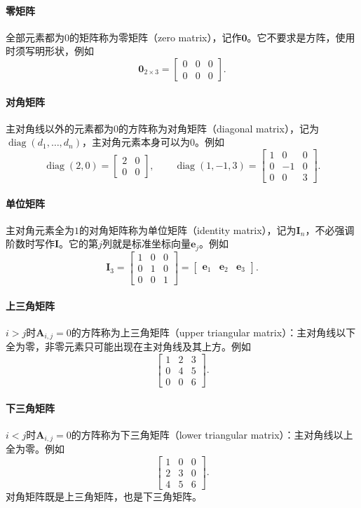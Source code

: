 \paragraph{零矩阵}
全部元素都为$0$的矩阵称为零矩阵（zero matrix），记作$\bm0$。它不要求是方阵，使用时须写明形状，例如
\[
 \bm0_{2\times3}=\begin{bmatrix}0&0&0\\0&0&0\end{bmatrix}.
\]

\paragraph{对角矩阵}
主对角线以外的元素都为$0$的方阵称为对角矩阵（diagonal matrix），记为$\operatorname{diag}(d_1,\ldots,d_n)$，主对角元素本身可以为$0$。例如
\[
 \operatorname{diag}(2,0)=\begin{bmatrix}2&0\\0&0\end{bmatrix},\qquad
 \operatorname{diag}(1,-1,3)=\begin{bmatrix}1&0&0\\0&-1&0\\0&0&3\end{bmatrix}.
\]

\paragraph{单位矩阵}
主对角元素全为$1$的对角矩阵称为单位矩阵（identity matrix），记为$\bm I_n$，不必强调阶数时写作$\bm I$。它的第$j$列就是标准坐标向量$\bm e_j$。例如
\[
 \bm I_3=\begin{bmatrix}1&0&0\\0&1&0\\0&0&1\end{bmatrix}=\begin{bmatrix}\bm e_1&\bm e_2&\bm e_3\end{bmatrix}.
\]

\paragraph{上三角矩阵}
$i>j$时$\bm A_{i,j}=0$的方阵称为上三角矩阵（upper triangular matrix）：主对角线以下全为零，非零元素只可能出现在主对角线及其上方。例如
\[
 \begin{bmatrix}1&2&3\\0&4&5\\0&0&6\end{bmatrix}.
\]

\paragraph{下三角矩阵}
$i<j$时$\bm A_{i,j}=0$的方阵称为下三角矩阵（lower triangular matrix）：主对角线以上全为零。例如
\[
 \begin{bmatrix}1&0&0\\2&3&0\\4&5&6\end{bmatrix}.
\]
对角矩阵既是上三角矩阵，也是下三角矩阵。

